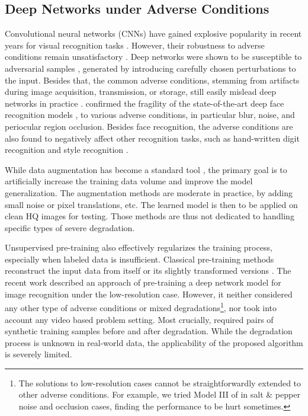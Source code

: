 \documentclass[10pt,twocolumn,twoside]{IEEEtran} %
\begin{document}
\subsection{Deep Networks under Adverse Conditions}

Convolutional neural networks (CNNs) have gained explosive popularity in recent years for visual recognition tasks \cite{Alex, karpathy2014large}. However, their robustness to adverse conditions remain unsatisfactory \cite{karahan2016image}. Deep networks were shown to be susceptible to adversarial samples \cite{goodfellow2014explaining}, generated by introducing carefully chosen perturbations to the input. 
Besides that,
the common  adverse conditions, stemming from artifacts during image acquisition, transmission, or storage, still easily mislead deep networks in practice \cite{dodge2016understanding}. \cite{karahan2016image} confirmed the fragility of the state-of-the-art deep face recognition models \cite{Alex, parkhi2015deep, szegedy2015going}, to various adverse conditions, in particular blur, noise, and periocular region occlusion. 
Besides face recognition, the adverse conditions are also found to negatively affect other recognition tasks, such as hand-written digit recognition \cite{basu2015learning} and style recognition \cite{vlrr}. 

While data augmentation has become a standard tool \cite{Alex}, the primary goal is to artificially  increase the training data volume and improve the model generalization. The augmentation methods are moderate in practice, by adding small noise or pixel translations, etc. The learned model is then to be applied on clean HQ images for testing. Those methods are thus not dedicated to handling specific types of severe degradation.

Unsupervised pre-training \cite{erhan2009difficulty} also effectively regularizes the training process, especially when labeled data is insufficient. Classical pre-training methods reconstruct the input data from itself \cite{erhan2009difficulty} or its slightly transformed versions \cite{masci2011stacked}. 
The recent work \cite{vlrr} described an approach of
pre-training a deep network model for image recognition under the low-resolution case. 
However, it neither considered any other type of adverse conditions or mixed degradations\footnote{The  solutions to low-resolution cases cannot be straightforwardly extended to other adverse conditions. For example, we tried Model III of \cite{vlrr} in salt \& pepper noise and occlusion cases, finding the performance to be hurt sometimes.}, nor took into account any video based problem setting. Most crucially, \cite{vlrr} required pairs of synthetic training samples before and after degradation. While the degradation process is unknown in real-world data, the applicability of the proposed algorithm is severely limited.
\end{document}
